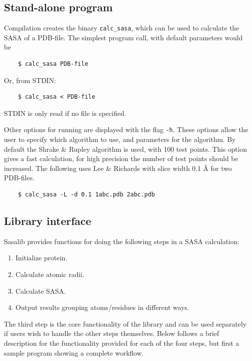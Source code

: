 \documentclass[a4paper,11pt]{article}
\begin{document}
\subsection{Stand-alone program}

Compilation creates the binary \texttt{calc\_sasa}, which can be used
to calculate the SASA of a PDB-file. The simplest program call, with
default parameters would be
\begin{verbatim}
    $ calc_sasa PDB-file
\end{verbatim}
Or, from STDIN:
\begin{verbatim} 
    $ calc_sasa < PDB-file    
\end{verbatim}
STDIN is only read if no file is specified.

Other options for running are displayed with the flag
\texttt{-h}. These options allow the user to specify which algorithm
to use, and parameters for the algorithm. By default the Shrake \&
Rupley algorithm is used, with 100 test points. This option gives a
fast calculation, for high precision the number of test points should
be increased. The following uses Lee \& Richards with slice width 0.1 Å
for two PDB-files.
\begin{verbatim}
    $ calc_sasa -L -d 0.1 1abc.pdb 2abc.pdb
\end{verbatim}

\subsection{Library interface}

Sasalib provides functions for doing the following steps in a SASA
calculation:
\begin{enumerate}
  \item Initialize protein.
  \item Calculate atomic radii.
  \item Calculate SASA.
  \item Output results grouping atoms/residues in different ways.
\end{enumerate}
The third step is the core functionality of the library and can be
used separately if users wish to handle the other steps
themselves. Below follows a brief description for the functionality
provided for each of the four steps, but first a sample program
showing a complete workflow.
\end{document}
